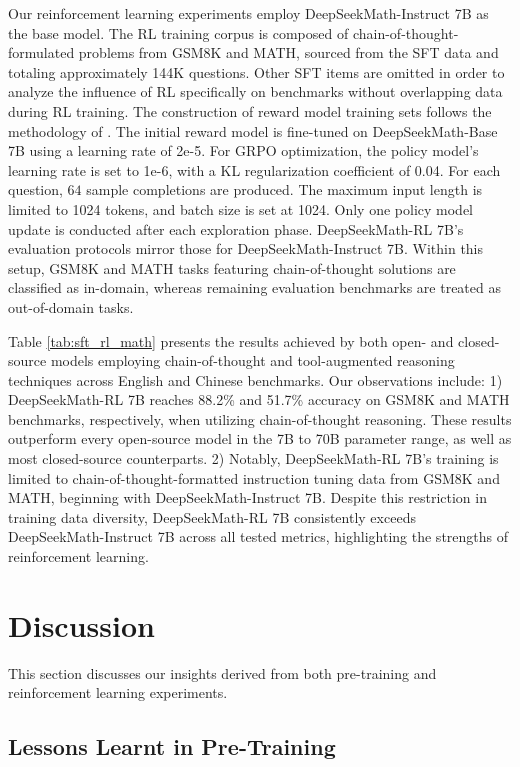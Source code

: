 Our reinforcement learning experiments employ DeepSeekMath-Instruct 7B as the base model. The RL training corpus is composed of chain-of-thought-formulated problems from GSM8K and MATH, sourced from the SFT data and totaling approximately 144K questions. Other SFT items are omitted in order to analyze the influence of RL specifically on benchmarks without overlapping data during RL training. The construction of reward model training sets follows the methodology of \citep{wang2023math}. The initial reward model is fine-tuned on DeepSeekMath-Base 7B using a learning rate of 2e-5. For GRPO optimization, the policy model’s learning rate is set to 1e-6, with a KL regularization coefficient of 0.04. For each question, $64$ sample completions are produced. The maximum input length is limited to 1024 tokens, and batch size is set at 1024. Only one policy model update is conducted after each exploration phase. DeepSeekMath-RL 7B’s evaluation protocols mirror those for DeepSeekMath-Instruct 7B. Within this setup, GSM8K and MATH tasks featuring chain-of-thought solutions are classified as in-domain, whereas remaining evaluation benchmarks are treated as out-of-domain tasks.

Table \ref{tab:sft_rl_math} presents the results achieved by both open- and closed-source models employing chain-of-thought and tool-augmented reasoning techniques across English and Chinese benchmarks. Our observations include: 1) DeepSeekMath-RL 7B reaches 88.2\% and 51.7\% accuracy on GSM8K and MATH benchmarks, respectively, when utilizing chain-of-thought reasoning. These results outperform every open-source model in the 7B to 70B parameter range, as well as most closed-source counterparts. 2) Notably, DeepSeekMath-RL 7B's training is limited to chain-of-thought-formatted instruction tuning data from GSM8K and MATH, beginning with DeepSeekMath-Instruct 7B. Despite this restriction in training data diversity, DeepSeekMath-RL 7B consistently exceeds DeepSeekMath-Instruct 7B across all tested metrics, highlighting the strengths of reinforcement learning.

\section{Discussion}
This section discusses our insights derived from both pre-training and reinforcement learning experiments.

\subsection{Lessons Learnt in Pre-Training}

